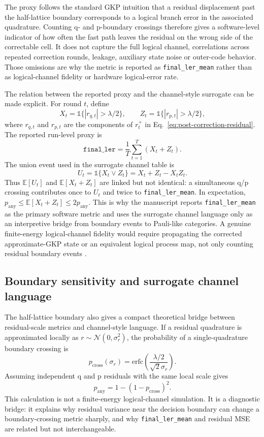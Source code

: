 \documentclass[11pt]{article}
\newcommand{\finalLER}{\texttt{final\_ler\_mean}}
\begin{document}
The proxy follows the standard GKP intuition that a residual displacement past
the half-lattice boundary corresponds to a logical branch error in the
associated quadrature.  Counting q- and p-boundary crossings therefore gives a
software-level indicator of how often the fast path leaves the residual on the
wrong side of the correctable cell.  It does not capture the full logical
channel, correlations across repeated correction rounds, leakage, auxiliary
state noise or outer-code behavior.  Those omissions are why the metric is
reported as \finalLER{} rather than as logical-channel fidelity or hardware
logical-error rate.

The relation between the reported proxy and the channel-style surrogate can be
made explicit.  For round \(t\), define
\[
    X_t=\mathbb{1}\{|r_{q,t}|>\lambda/2\},\qquad
    Z_t=\mathbb{1}\{|r_{p,t}|>\lambda/2\},
\]
where \(r_{q,t}\) and \(r_{p,t}\) are the components of
\(r_t^{+}\) in Eq.~\eqref{eq:post-correction-residual}.  The reported
run-level proxy is
\[
    \texttt{final\_ler}=\frac{1}{T}\sum_{t=1}^T (X_t+Z_t).
\]
The union event used in the surrogate channel table is
\[
    U_t=\mathbb{1}\{X_t\lor Z_t\}=X_t+Z_t-X_tZ_t .
\]
Thus \(\mathbb{E}[U_t]\) and \(\mathbb{E}[X_t+Z_t]\) are linked but not
identical: a simultaneous q/p crossing contributes once to \(U_t\) and twice to
\finalLER{}.  In expectation, \(p_{\mathrm{any}}\le
\mathbb{E}[X_t+Z_t]\le 2p_{\mathrm{any}}\).  This is why the manuscript reports
\finalLER{} as the primary software metric and uses the surrogate channel
language only as an interpretive bridge from boundary events to Pauli-like
categories.  A genuine finite-energy logical-channel fidelity would require
propagating the corrected approximate-GKP state or an equivalent logical
process map, not only counting residual boundary events
\cite{jafarzadeh2025,hastrup2023,zheng2024}.

\subsection{Boundary sensitivity and surrogate channel language}

The half-lattice boundary also gives a compact theoretical bridge between
residual-scale metrics and channel-style language.  If a residual quadrature is
approximated locally as \(r\sim\mathcal{N}(0,\sigma_r^2)\), the probability of a
single-quadrature boundary crossing is
\begin{equation}
    p_{\mathrm{cross}}(\sigma_r)=
    \mathrm{erfc}\!\left(\frac{\lambda/2}{\sqrt{2}\sigma_r}\right).
\end{equation}
Assuming independent q and p residuals with the same local scale gives
\begin{equation}
    p_{\mathrm{any}} = 1-(1-p_{\mathrm{cross}})^2 .
\end{equation}
This calculation is not a finite-energy logical-channel simulation.  It is a
diagnostic bridge: it explains why residual variance near the decision
boundary can change a boundary-crossing metric sharply, and why \finalLER{} and
residual MSE are related but not interchangeable.
\end{document}
